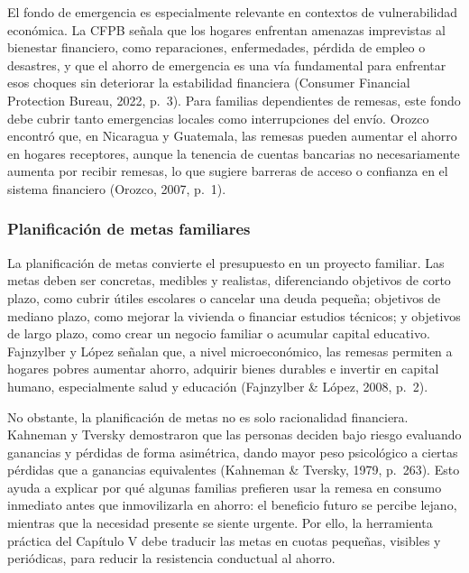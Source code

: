 \documentclass[12pt,letterpaper]{article}
\begin{document}
El fondo de emergencia es especialmente relevante en contextos de vulnerabilidad económica. La CFPB señala que los hogares enfrentan amenazas imprevistas al bienestar financiero, como reparaciones, enfermedades, pérdida de empleo o desastres, y que el ahorro de emergencia es una vía fundamental para enfrentar esos choques sin deteriorar la estabilidad financiera (Consumer Financial Protection Bureau, 2022, p.~3). Para familias dependientes de remesas, este fondo debe cubrir tanto emergencias locales como interrupciones del envío. Orozco encontró que, en Nicaragua y Guatemala, las remesas pueden aumentar el ahorro en hogares receptores, aunque la tenencia de cuentas bancarias no necesariamente aumenta por recibir remesas, lo que sugiere barreras de acceso o confianza en el sistema financiero (Orozco, 2007, p.~1).

\subsubsection{\texorpdfstring{\textbf{Planificación de metas familiares}}{Planificación de metas familiares}}\label{planificaciuxf3n-de-metas-familiares}

La planificación de metas convierte el presupuesto en un proyecto familiar. Las metas deben ser concretas, medibles y realistas, diferenciando objetivos de corto plazo, como cubrir útiles escolares o cancelar una deuda pequeña; objetivos de mediano plazo, como mejorar la vivienda o financiar estudios técnicos; y objetivos de largo plazo, como crear un negocio familiar o acumular capital educativo. Fajnzylber y López señalan que, a nivel microeconómico, las remesas permiten a hogares pobres aumentar ahorro, adquirir bienes durables e invertir en capital humano, especialmente salud y educación (Fajnzylber \& López, 2008, p.~2).

No obstante, la planificación de metas no es solo racionalidad financiera. Kahneman y Tversky demostraron que las personas deciden bajo riesgo evaluando ganancias y pérdidas de forma asimétrica, dando mayor peso psicológico a ciertas pérdidas que a ganancias equivalentes (Kahneman \& Tversky, 1979, p.~263). Esto ayuda a explicar por qué algunas familias prefieren usar la remesa en consumo inmediato antes que inmovilizarla en ahorro: el beneficio futuro se percibe lejano, mientras que la necesidad presente se siente urgente. Por ello, la herramienta práctica del Capítulo V debe traducir las metas en cuotas pequeñas, visibles y periódicas, para reducir la resistencia conductual al ahorro.
\end{document}
